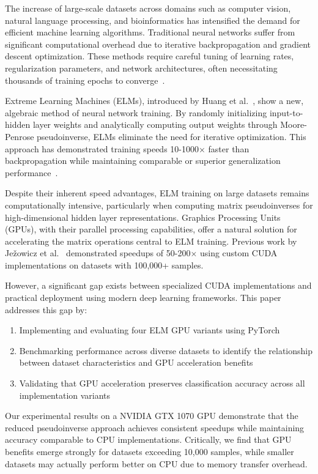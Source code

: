 \documentclass[conference]{IEEEtran}
\begin{document}
The increase of large-scale datasets across domains such as computer vision, natural language processing, and bioinformatics has intensified the demand for efficient machine learning algorithms. Traditional neural networks suffer from significant computational overhead due to iterative backpropagation and gradient descent optimization. These methods require careful tuning of learning rates, regularization parameters, and network architectures, often necessitating thousands of training epochs to converge~\cite{huang2006elm}.

Extreme Learning Machines (ELMs), introduced by Huang et al.~\cite{huang2006elm}, show a new, algebraic method of neural network training. By randomly initializing input-to-hidden layer weights and analytically computing output weights through Moore-Penrose pseudoinverse, ELMs eliminate the need for iterative optimization. This approach has demonstrated training speeds 10-1000× faster than backpropagation while maintaining comparable or superior generalization performance~\cite{huang2012elm}.

Despite their inherent speed advantages, ELM training on large datasets remains computationally intensive, particularly when computing matrix pseudoinverses for high-dimensional hidden layer representations. Graphics Processing Units (GPUs), with their parallel processing capabilities, offer a natural solution for accelerating the matrix operations central to ELM training. Previous work by Ježowicz et al.~\cite{jezowicz2015gpu} demonstrated speedups of 50-200× using custom CUDA implementations on datasets with 100,000+ samples.

However, a significant gap exists between specialized CUDA implementations and practical deployment using modern deep learning frameworks. This paper addresses this gap by:

\begin{enumerate}
\item Implementing and evaluating four ELM GPU variants using PyTorch
\item Benchmarking performance across diverse datasets to identify the relationship between dataset characteristics and GPU acceleration benefits
\item Validating that GPU acceleration preserves classification accuracy across all implementation variants
\end{enumerate}

Our experimental results on a NVIDIA GTX 1070 GPU demonstrate that the reduced pseudoinverse approach achieves consistent speedups while maintaining accuracy comparable to CPU implementations. Critically, we find that GPU benefits emerge strongly for datasets exceeding 10,000 samples, while smaller datasets may actually perform better on CPU due to memory transfer overhead.
\end{document}
